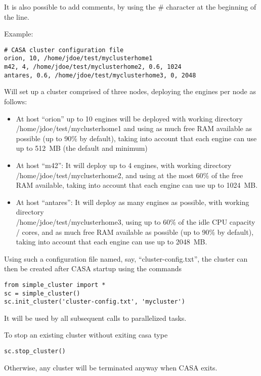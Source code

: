 It is also possible to add comments, by using the \# character at the beginning of the line. 

\vspace{2mm}

\noindent
Example:

\begin{center}
\begin{verbatim}
# CASA cluster configuration file
orion, 10, /home/jdoe/test/myclusterhome1
m42, 4, /home/jdoe/test/myclusterhome2, 0.6, 1024
antares, 0.6, /home/jdoe/test/myclusterhome3, 0, 2048
\end{verbatim}
\end{center}
Will set up a cluster comprised of three nodes, deploying the engines per node as follows:

\begin{itemize}
\item At host ``orion'' up to 10 engines will be deployed with working
  directory\\ /home/jdoe/test/myclusterhome1 and using as much free RAM
  available as possible (up to 90\% by default), taking into account
  that each engine can use up to 512~MB (the default and minimum)

\item At host ``m42'': It will deploy up to 4 engines, with working
  directory\\ /home/jdoe/test/myclusterhome2, and using at the most 60\%
  of the free RAM available, taking into account that each engine can
  use up to 1024~MB.

\item At host ``antares'': It will deploy as many engines as possible,
  with working directory\\ /home/jdoe/test/myclusterhome3, using up to
  60\% of the idle CPU capacity / cores, and as much free RAM
  available as possible (up to 90\% by default), taking into account
  that each engine can use up to 2048~MB.
\end{itemize}

Using such a configuration file named, say, ``cluster-config.txt'', the cluster can then
be created after CASA startup using the commands
\begin{verbatim}
from simple_cluster import *
sc = simple_cluster()
sc.init_cluster('cluster-config.txt', 'mycluster')
\end{verbatim}
It will be used by all subsequent calls to parallelized tasks.

To stop an existing cluster without exiting casa type
\begin{verbatim}
sc.stop_cluster()
\end{verbatim}
Otherwise, any cluster will be terminated anyway when CASA exits.

